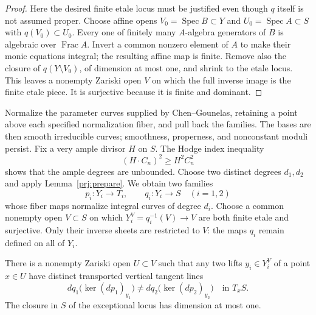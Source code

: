 \begin{proof}
Here the desired finite etale locus must be justified even
though $q$ itself is not assumed proper. Choose affine opens
$V_0=\operatorname{Spec}B\subset Y$ and
$U_0=\operatorname{Spec}A\subset S$ with $q(V_0)\subset U_0$.
Every one of finitely many $A$-algebra generators of $B$ is
algebraic over $\operatorname{Frac}A$. Invert a common nonzero
element of $A$ to make their monic equations integral; the
resulting affine map is finite. Remove also the closure of
$q(Y\setminus V_0)$, of dimension at most one, and shrink to
the etale locus. This leaves a nonempty Zariski open $V$ on
which the full inverse image is the finite etale piece.
It is surjective because it is finite and dominant.
\end{proof}

Normalize the parameter curves supplied by Chen--Gounelas,
retaining a point above each specified normalization fiber,
and pull back the families. The bases are then smooth
irreducible curves; smoothness, properness, and nonconstant
moduli persist. Fix a very ample divisor $H$ on $S$. The
Hodge index inequality
\[
(H\cdot C_n)^2\ge H^2 C_n^2
\]
shows that the ample degrees are unbounded.
Choose two distinct degrees $d_1,d_2$ and apply
Lemma~\ref{prj:prepare}. We obtain two families
\[
p_i:Y_i\longrightarrow T_i,\qquad q_i:Y_i\longrightarrow S
\quad(i=1,2)
\]
whose fiber maps normalize integral curves of degree $d_i$.
Choose a common nonempty open $V\subset S$ on which
$Y_i^V=q_i^{-1}(V)\to V$ are both finite etale and surjective.
Only their inverse sheets are restricted to $V$: the maps
$q_i$ remain defined on all of $Y_i$.

\begin{lemma}\label{prj:transverse}
There is a nonempty Zariski open $U\subset V$ such that any
two lifts $y_i\in Y_i^V$ of a point $x\in U$ have distinct
transported vertical tangent lines
\[
dq_1\bigl(\ker(dp_1)_{y_1}\bigr)
\ne dq_2\bigl(\ker(dp_2)_{y_2}\bigr)
\quad\text{in }T_xS.
\]
The closure in $S$ of the exceptional locus has dimension
at most one.
\end{lemma}

